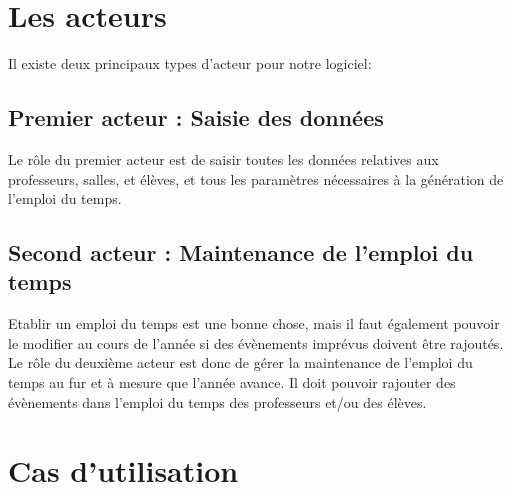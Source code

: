 \documentclass[12pt,a4paper,french]{article}
\begin{document}
\newpage
\section{Les acteurs}        
Il existe deux principaux types d'acteur pour notre logiciel:

\subsection{Premier acteur : Saisie des données}
Le rôle du premier acteur est de saisir toutes les données relatives aux professeurs, salles, et élèves, et tous les paramètres nécessaires à la génération de l'emploi du temps.
        
\subsection{Second acteur : Maintenance de l'emploi du temps}
Etablir un emploi du temps est une bonne chose, mais il faut  également pouvoir le modifier au cours de l'année si des évènements imprévus doivent être rajoutés.
Le rôle du deuxième acteur est donc de gérer la maintenance de l'emploi du temps au fur et à mesure que l'année avance. Il doit pouvoir rajouter des évènements dans l'emploi du temps des professeurs et/ou des élèves.


\newpage
\section{Cas d'utilisation}
\end{document}
